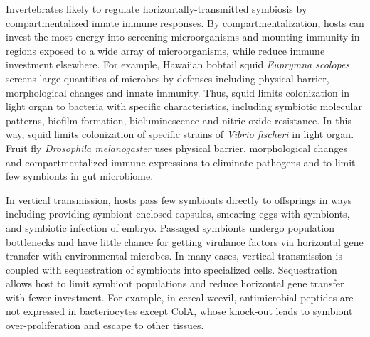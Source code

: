 \documentclass[11pt]{article}
\begin{document}
\begin{sloppypar}
Invertebrates likely to regulate horizontally-transmitted symbiosis by compartmentalized innate immune responses. 
By compartmentalization, hosts can invest the most energy into screening microorganisms and mounting immunity in regions exposed to a wide array of microorganisms, while reduce immune investment elsewhere. 
For example, Hawaiian bobtail squid \textit{Euprymna scolopes} screens large quantities of microbes by defenses including physical barrier, morphological changes and innate immunity. 
Thus, squid limits colonization in light organ to bacteria with specific characteristics, including symbiotic molecular patterns, biofilm formation, bioluminescence and nitric oxide resistance. 
In this way, squid limits colonization of specific strains of \textit{Vibrio fischeri} in light organ. 
Fruit fly \textit{Drosophila melanogaster} uses physical barrier, morphological changes and compartmentalized immune expressions to eliminate pathogens and to limit few symbionts in gut microbiome. 

\par

In vertical transmission, hosts pass few symbionts directly to offsprings in ways including providing symbiont-enclosed capsules, smearing eggs with symbionts, and symbiotic infection of embryo. 
Passaged symbionts undergo population bottlenecks and have little chance for getting virulance factors via horizontal gene transfer with environmental microbes. 
In many cases, vertical transmission is coupled with sequestration of symbionts into specialized cells. 
Sequestration allows host to limit symbiont populations and reduce horizontal gene transfer with fewer investment. 
For example, in cereal weevil, antimicrobial peptides are not expressed in bacteriocytes except ColA, whose knock-out leads to symbiont over-proliferation and escape to other tissues. 

\par


\end{sloppypar}
\end{document}
